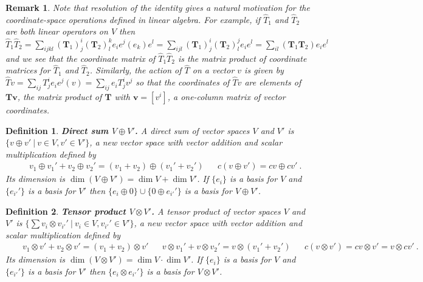 \documentclass[11pt,fleqn]{article}
\newcommand{\op}[1]{\ensuremath{\hat{#1}}}
\newcommand{\bmit}[1]{{\bfseries\itshape\mathversion{bold}#1}}
\newcommand{\bo}[1]{\ensuremath{\mathbf{#1}}}
\theoremstyle{mystyle}
\newtheorem{dfn}{Definition}
\newtheorem{rmk}{Remark}
\numberwithin{equation}{section}
\begin{document}
\begin{rmk}
Note that resolution of the identity gives a natural motivation for the coordinate-space operations defined in linear algebra.
For example, if $\op{T}_1$ and $\op{T}_2$ are both linear operators on $V$ then $\op{T}_1\op{T}_2=\sum_{ijkl}(\bo{T}_1)_j^i(\bo{T}_2)_l^ke_ie^j(e_k)e^l=\sum_{ijl}(\bo{T}_1)_j^i(\bo{T}_2)_l^je_ie^l=\sum_{il}(\bo{T}_1\bo{T}_2)e_ie^l$ and we see that the coordinate matrix of $\op{T}_1\op{T}_2$ is the matrix product of coordinate matrices for $\op{T}_1$ and $\op{T}_2$.
Similarly, the action of $\op{T}$ on a vector $v$ is given by $\op{T}v=\sum_{ij}T_j^ie_ie^j(v)=\sum_{ij}e_iT_j^iv^j$ so that the coordinates of $\op{T}v$ are elements of $\bo{T}\bo{v}$, the matrix product of $\bo{T}$ with $\bo{v}=[v^i]$, a one-column matrix of vector coordinates. 
\end{rmk}

\begin{dfn}
\bmit{Direct sum $V\oplus V'$.}
\label{vspace-direct-sum}
A \textit{direct sum} of vector spaces $V$ and $V'$ is $\{ v\oplus v'\ |\  v\in V,  v'\in V'\}$, a new vector space with vector addition and scalar multiplication defined by
\begin{align*}
&&
   v_1\oplus v_1' +  v_2\oplus v_2'
=
  ( v_1+ v_2)\oplus( v_1'+ v_2')
&&
  c( v\oplus v') = c v\oplus c v'\ .
\end{align*}
Its dimension is $\dim(V\oplus V')=\dim V + \dim V'$.
If $\{ e_i\}$ is a basis for $V$ and $\{ e_{i'}'\}$ is a basis for $V'$ then $\{ e_i\oplus0\}\cup\{0\oplus e_{i'}'\}$ is a basis for $V\oplus V'$.
\end{dfn}


\begin{dfn}
\bmit{Tensor product $V\otimes V'$.}
\label{vspace-tensor-product}
A \textit{tensor product} of vector spaces $V$ and $V'$ is $\{\sum v_i\otimes v_{i'}'\ |\  v_i\in V,  v_{i'}'\in V'\}$, a new vector space with vector addition and scalar multiplication defined by
\begin{align*}
&&
   v_1\otimes v' +  v_2\otimes v'
=
  ( v_1+ v_2)\otimes v'
&&
   v\otimes v_1' +  v\otimes v_2'
=
   v\otimes( v_1'+ v_2')
&&
  c( v\otimes v')
=
  c v\otimes v'
=
   v\otimes c v'\ .
\end{align*}
Its dimension is $\dim(V\otimes V')=\dim V\cdot\dim V'$.
If $\{ e_i\}$ is a basis for $V$ and $\{ e_{i'}'\}$ is a basis for $V'$ then $\{ e_i\otimes e_{i'}'\}$ is a basis for $V\otimes V'$.
\end{dfn}
\end{document}
